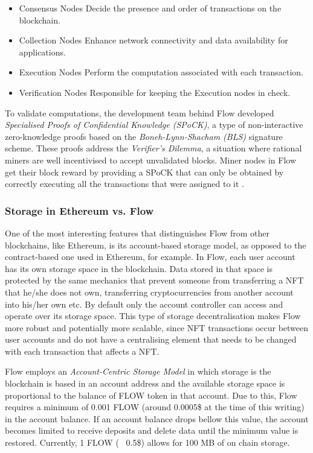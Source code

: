 \documentclass[../main.tex]{subfiles}
\begin{document}
\begin{itemize}
    \item{Consensus Nodes} Decide the presence and order of transactions on the blockchain.
    \item {Collection Nodes} Enhance network connectivity and data availability for applications.
    \item {Execution Nodes} Perform the computation associated with each transaction.
    \item {Verification Nodes} Responsible for keeping the Execution nodes in check.
\end{itemize}

To validate computations, the development team behind Flow developed \textit{Specialised Proofs of Confidential Knowledge (SPoCK)}, a type of non-interactive zero-knowledge proofs based on the \textit{Boneh-Lynn-Shacham (BLS)} signature scheme. These proofs address the \textit{Verifier's Dilemma}, a situation where rational miners are well incentivised to accept unvalidated blocks. Miner nodes in Flow get their block reward by providing a SPoCK that can only be obtained by correctly executing all the transactions that were assigned to it \cite{Ben2020}.

\subsubsection{Storage in Ethereum vs. Flow}
One of the most interesting features that distinguishes Flow from other blockchains, like Ethereum, is its account-based storage model, as opposed to the contract-based one used in Ethereum, for example. In Flow, each user account has its own storage space in the blockchain. Data stored in that space is protected by the same mechanics that prevent someone from transferring a NFT that he/she does not own, transferring cryptocurrencies from another account into his/her own etc. By default only the account controller can access and operate over its storage space. This type of storage decentralisation makes Flow more robust and potentially more scalable, since NFT transactions occur between user accounts and do not have a centralising element that needs to be changed with each transaction that affects a NFT.
\par
Flow employs an \textit{Account-Centric Storage Model} in which storage is the blockchain is based in an account address and the available storage space is proportional to the balance of FLOW token in that account. Due to this, Flow requires a minimum of 0.001 FLOW (around 0.0005\$ at the time of this writing) in the account balance. If an account balance drops bellow this value, the account becomes limited to receive deposits and delete data until the minimum value is restored. Currently, 1 FLOW (~ 0.5\$) allows for 100 MB of on chain storage.
\end{document}
